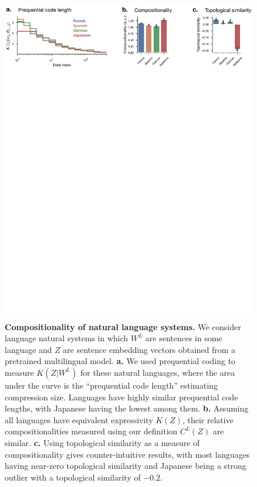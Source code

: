 \documentclass{article}
\begin{document}
\begin{figure}[ht]
    \centering
    \includegraphics[width=\linewidth]{figures/natural.pdf}
    \caption{\textbf{Compositionality of natural language systems.} We consider language natural systems in which $W^L$ are sentences in some language and $Z$ are sentence embedding vectors obtained from a pretrained multilingual model. \textbf{a.} We used prequential coding to measure $K(Z | W^L)$ for these natural languages, where the area under the curve is the ``prequential code length'' estimating compression size. Languages have highly similar prequential code lengths, with Japanese having the lowest among them. \textbf{b.} Assuming all languages have equivalent expressivity $K(Z)$, their relative compositionalities measured using our definition $C^L(Z)$ are similar. \textbf{c.} Using topological similarity as a measure of compositionality gives counter-intuitive results, with most languages having near-zero topological similarity and Japanese being a strong outlier with a topological similarity of $-0.2$.}
    \label{fig:natural}
\end{figure}
\end{document}
